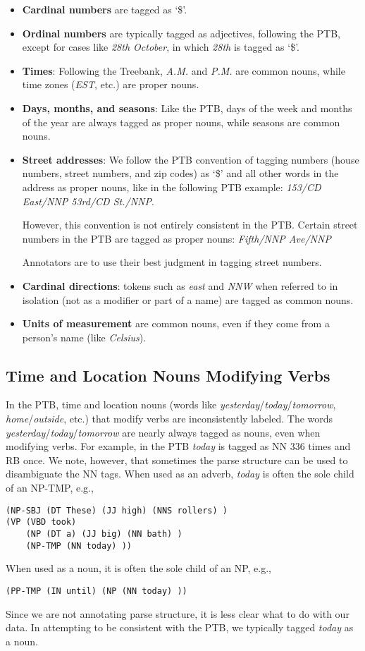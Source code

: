 \documentclass[11pt,letterpaper]{article}
\begin{document}
\begin{itemize}
\item \textbf{Cardinal numbers} are tagged as `\$'.
\item \textbf{Ordinal numbers} are typically tagged as adjectives, following the PTB, except for cases like 
\emph{28th October}, in which \emph{28th} is tagged as `\$'.
\item \textbf{Times}: Following the Treebank, \emph{A.M.} and \emph{P.M.} are common nouns, while time zones (\emph{EST}, etc.) are proper nouns.
\item \textbf{Days, months, and seasons}: Like the PTB, days of the week and months of the year are always tagged as proper nouns, while seasons are common nouns.
\item \textbf{Street addresses}: We follow the PTB convention of tagging numbers (house numbers, street numbers, and zip codes) as `\$' and all other words in the address as proper nouns, like in the following PTB example: \emph{153/CD East/NNP 53rd/CD St./NNP}. 
  
However, this convention is not entirely consistent in the PTB. Certain street numbers in the PTB are tagged as proper nouns: \emph{Fifth/NNP Ave/NNP}

Annotators are to use their best judgment in tagging street numbers.
\item \textbf{Cardinal directions}: tokens such as \emph{east} and \emph{NNW} when referred to in isolation (not as a modifier or part of a name) are tagged as common nouns.
\item \textbf{Units of measurement} are common nouns, even if they come from a person's name (like \emph{Celsius}).
\end{itemize}

\subsection{Time and Location Nouns Modifying Verbs}

In the PTB, time and location nouns (words like \emph{yesterday}/\emph{today}/\emph{tomorrow}, \emph{home}/\emph{outside}, etc.) that modify verbs are inconsistently labeled. 
The words \emph{yesterday}/\emph{today}/\emph{tomorrow} are nearly always tagged as nouns, even when modifying verbs.
For example, in the PTB \emph{today} is tagged as NN 336 times and RB once. We note, however, that sometimes 
the parse structure can be used to disambiguate the NN tags. When used as an adverb, \emph{today} is often 
the sole child of an NP-TMP, e.g.,
\begin{verbatim}
(NP-SBJ (DT These) (JJ high) (NNS rollers) )
(VP (VBD took) 
    (NP (DT a) (JJ big) (NN bath) )
    (NP-TMP (NN today) ))
\end{verbatim}
When used as a noun, it is often the sole child of an NP, e.g.,
\begin{verbatim}
(PP-TMP (IN until) (NP (NN today) ))
\end{verbatim}
Since we are not annotating parse structure, it is less clear what to do with our data. In attempting to be consistent with the PTB, we typically tagged \emph{today} as a noun. 
\end{document}
